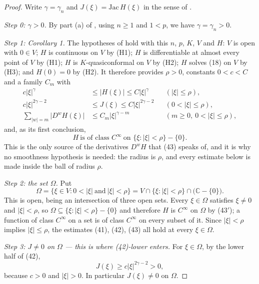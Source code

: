 \begin{proof}
Write $\gamma=\gamma_n$ and $J(\xi)=\mathrm{Jac}\,H(\xi)$ in the sense of
.

\emph{Step 0: $\gamma>0$.}  By part (a) of , using
$n\ge1$ and $1<p$, we have $\gamma=\gamma_n>0$.

\emph{Step 1: Corollary 1.}  The hypotheses of  hold with this
$n$, $p$, $K$, $V$ and $H$: $V$ is open with $0\in V$; $H$ is continuous on
$V$ by (H1); $H$ is differentiable at almost every point of $V$ by (H1); $H$ is
$K$-quasiconformal on $V$ by (H2); $H$ solves (18) on $V$ by (H3); and
$H(0)=0$ by (H2).  It therefore provides $\rho>0$, constants $0<c<C$ and a
family $C_m$ with
\begin{align}
  c|\xi|^{\gamma}&\le|H(\xi)|\le C|\xi|^{\gamma}
    &&(|\xi|\le\rho),\tag{41}\\
  c|\xi|^{2\gamma-2}&\le J(\xi)\le C|\xi|^{2\gamma-2}
    &&(0<|\xi|\le\rho),\tag{42}\\
  \sum_{|w|=m}\bigl|D^{w}H(\xi)\bigr|&\le C_m|\xi|^{\gamma-m}
    &&(m\ge0,\ 0<|\xi|\le\rho),\tag{43}
\end{align}
and, as its first conclusion,
\begin{equation}\tag{43$'$}
  H\ \text{is of class }C^\infty\ \text{on }\{\xi:|\xi|<\rho\}-\{0\} .
\end{equation}
This is the only source of the derivatives $D^{w}H$ that (43) speaks of, and it
is why no smoothness hypothesis is needed: the radius is $\rho$, and every
estimate below is made inside the ball of radius $\rho$.

\emph{Step 2: the set $\Omega$.}  Put
\[
  \Omega=\bigl\{\xi\in V:0<|\xi|\ \text{and}\ |\xi|<\rho\bigr\}
  =V\cap\{\xi:|\xi|<\rho\}\cap\bigl(\mathbb{C}-\{0\}\bigr).
\]
This is open, being an intersection of three open sets.  Every $\xi\in\Omega$
satisfies $\xi\neq0$ and $|\xi|<\rho$, so
$\Omega\subseteq\{\xi:|\xi|<\rho\}-\{0\}$ and therefore $H$ is $C^\infty$ on
$\Omega$ by (43$'$); a function of class $C^\infty$ on a set is of class
$C^\infty$ on every subset of it.  Since $|\xi|<\rho$ implies $|\xi|\le\rho$, the estimates
(41), (42), (43) all hold at every $\xi\in\Omega$.

\emph{Step 3: $J\neq0$ on $\Omega$ --- this is where (42)-lower enters.}  For
$\xi\in\Omega$, by the lower half of (42),
\begin{equation}\tag{1}
  J(\xi)\ge c|\xi|^{2\gamma-2}>0,
\end{equation}
because $c>0$ and $|\xi|>0$.  In particular $J(\xi)\neq0$ on $\Omega$.


\end{proof}
